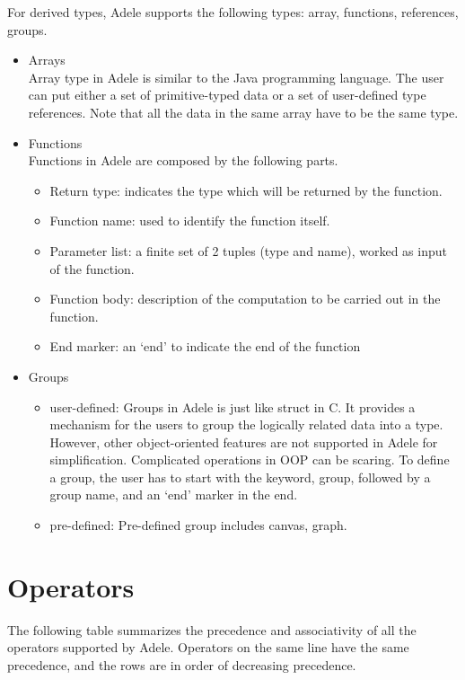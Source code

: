 \documentclass[11pt,letterpaper]{article}
\begin{document}
For derived types, Adele supports the following types: array, functions, references, groups.
\begin{itemize}
\item Arrays \\
Array type in Adele is similar to the Java programming language. The user can put either a set of primitive-typed data or a set of user-defined type references. Note that all the data in the same array have to be the same type.

\item Functions \\
Functions in Adele are composed by the following parts.
	\begin{itemize}
		\item Return type: indicates the type which will be returned by the function.
		\item Function name: used to identify the function itself.
		\item Parameter list: a finite set of 2 tuples (type and name), worked as input of the function.
		\item Function body: description of the computation to be carried out in the function.
		\item End marker: an ‘end’ to indicate the end of the function
	\end{itemize}
	
\item Groups
	\begin{itemize}
		\item user-defined: Groups in Adele is just like struct in C. It provides a mechanism for the users to group the logically related 	data into a type. However, other object-oriented features are not supported in Adele for simplification. Complicated operations in OOP can be scaring. To define a group, the user has to start with the keyword, group, followed by a group name, and an ‘end’ marker in the end.
		\item pre-defined: Pre-defined group includes canvas, graph.
	\end{itemize}
\end{itemize}

\section {Operators}
The following table summarizes the precedence and associativity of all the operators supported by Adele. Operators on the same line have the same precedence, and the rows are in order of decreasing precedence.
\end{document}
